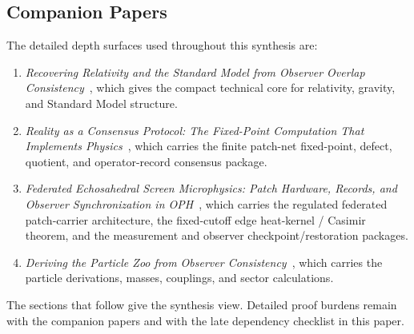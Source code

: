 \documentclass[11pt]{article}
\begin{document}
\subsection*{Companion Papers}

The detailed depth surfaces used throughout this synthesis are:
\begin{enumerate}[leftmargin=2em]
\item \emph{Recovering Relativity and the Standard Model from Observer Overlap Consistency}~\cite{ophcompact}, which gives the compact technical core for relativity, gravity, and Standard Model structure.
\item \emph{Reality as a Consensus Protocol: The Fixed-Point Computation That Implements Physics}~\cite{ophconsensus}, which carries the finite patch-net fixed-point, defect, quotient, and operator-record consensus package.
\item \emph{Federated Echosahedral Screen Microphysics: Patch Hardware, Records, and Observer Synchronization in OPH}~\cite{ophmicrophysics}, which carries the regulated federated patch-carrier architecture, the fixed-cutoff edge heat-kernel / Casimir theorem, and the measurement and observer checkpoint/restoration packages.
\item \emph{Deriving the Particle Zoo from Observer Consistency}~\cite{ophparticles}, which carries the particle derivations, masses, couplings, and sector calculations.
\end{enumerate}

The sections that follow give the synthesis view. Detailed proof burdens remain with the companion
papers and with the late dependency checklist in this paper.

\def\OPHSkipEmbeddedReferences{1}



\appendix


\end{document}
